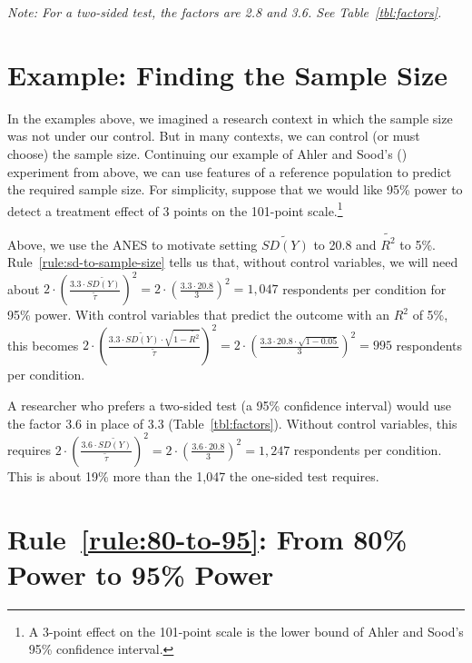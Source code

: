 \documentclass[12pt]{article}
\begin{document}
{\noindent \footnotesize\textit{Note: For a two-sided test, the factors are 2.8 and 3.6. See Table~\ref{tbl:factors}.}}

\section*{Example: Finding the Sample Size}

In the examples above, we imagined a research context in which the sample size was not under our control.
But in many contexts, we can control (or must choose) the sample size.
Continuing our example of Ahler and Sood's (\citeyear{Ahler2018}) experiment from above, we can use features of a reference population to predict the required sample size.
For simplicity, suppose that we would like 95\% power to detect a treatment effect of 3 points on the 101-point scale.\footnote{A 3-point effect on the 101-point scale is the lower bound of Ahler and Sood's 95\% confidence interval.}

Above, we use the ANES to motivate setting $\widetilde{SD(Y)}$ to 20.8 and $\widetilde{R^{2}}$ to 5\%.
Rule~\ref{rule:sd-to-sample-size} tells us that, without control variables, we will need about $2 \cdot \left( \frac{3.3 \cdot \widetilde{SD(Y)}}{\widetilde{\tau}} \right)^{2} = 2 \cdot \left( \frac{3.3 \cdot 20.8}{3} \right)^{2} = 1{,}047$ respondents per condition for 95\% power.
With control variables that predict the outcome with an $R^2$ of 5\%, this becomes ${2 \cdot \left( \frac{3.3 \cdot \widetilde{SD(Y)} \cdot \sqrt{1 - \widetilde{R^{2}}}}{\widetilde{\tau}} \right)}^{2} = 2 \cdot \left( \frac{3.3 \cdot 20.8 \cdot \sqrt{1 - 0.05}}{3} \right)^{2} = 995$ respondents per condition.

A researcher who prefers a two-sided test (a 95\% confidence interval) would use the factor 3.6 in place of 3.3 (Table~\ref{tbl:factors}).
Without control variables, this requires $2 \cdot \left( \frac{3.6 \cdot \widetilde{SD(Y)}}{\widetilde{\tau}} \right)^{2} = 2 \cdot \left( \frac{3.6 \cdot 20.8}{3} \right)^{2} = 1{,}247$ respondents per condition.
This is about 19\% more than the 1,047 the one-sided test requires.

\section*{Rule~\ref{rule:80-to-95}: From 80\% Power to 95\% Power}
\end{document}
